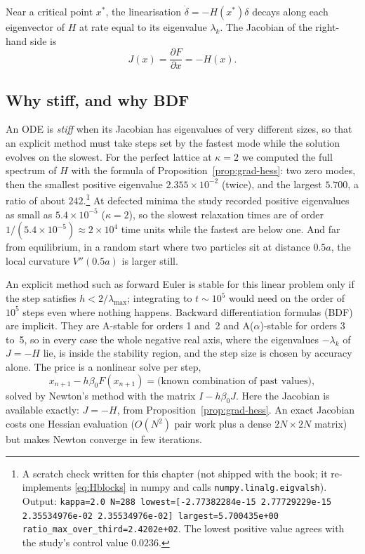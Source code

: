 Near a critical point $x^*$, the linearisation $\dot\delta=-H(x^*)\delta$ decays along each eigenvector of $H$ at rate
equal to its eigenvalue $\lambda_k$. The Jacobian of the right-hand side is
\begin{equation}
J(x)=\frac{\partial F}{\partial x}=-H(x).
\end{equation}

\subsection{Why stiff, and why BDF}
An ODE is \emph{stiff} when its Jacobian has eigenvalues of very different sizes, so that an explicit method must
take steps set by the fastest mode while the solution evolves on the slowest. For the perfect lattice at $\kappa=2$ we
computed the full spectrum of $H$ with the formula of Proposition~\ref{prop:grad-hess}: two zero modes, then the
smallest positive eigenvalue $2.355\times10^{-2}$ (twice), and the largest $5.700$, a ratio of about
$242$.\footnote{\label{fn:hess}A scratch check written for this chapter (not shipped with the book; it re-implements
\eqref{eq:Hblocks} in numpy and calls \texttt{numpy.linalg.eigvalsh}). Output:
\texttt{kappa=2.0 N=288 lowest=[-2.77382284e-15 2.77729229e-15 2.35534976e-02 2.35534976e-02]
largest=5.700435e+00 ratio\_max\_over\_third=2.4202e+02}. The lowest positive value agrees with the study's control
value $0.0236$.} At defected minima the study recorded positive eigenvalues as small as $5.4\times10^{-5}$
($\kappa=2$), so the slowest relaxation times are of order $1/(5.4\times10^{-5})\approx2\times10^4$ time units while the
fastest are below one. And far from equilibrium, in a random start where two particles sit at distance $0.5a$, the
local curvature $V''(0.5a)$ is larger still.

An explicit method such as forward Euler is stable for this linear problem only if the step satisfies
$h<2/\lambda_{\max}$; integrating to $t\sim10^5$ would need on the order of $10^5$ steps even where nothing happens.
Backward differentiation formulas (BDF) are implicit. They are A-stable for orders 1 and~2 and A($\alpha$)-stable for
orders 3 to~5, so in every case the whole negative real axis, where the eigenvalues $-\lambda_k$ of $J=-H$ lie, is
inside the stability region, and the step size is chosen by accuracy alone. The price
is a nonlinear solve per step,
\begin{equation}
x_{n+1}-h\beta_0F(x_{n+1})=\text{(known combination of past values)},
\end{equation}
solved by Newton's method with the matrix $I-h\beta_0J$. Here the Jacobian is available exactly: $J=-H$, from
Proposition~\ref{prop:grad-hess}. An exact Jacobian costs one Hessian evaluation ($O(N^2)$ pair work plus a dense
$2N\times2N$ matrix) but makes Newton converge in few iterations.

